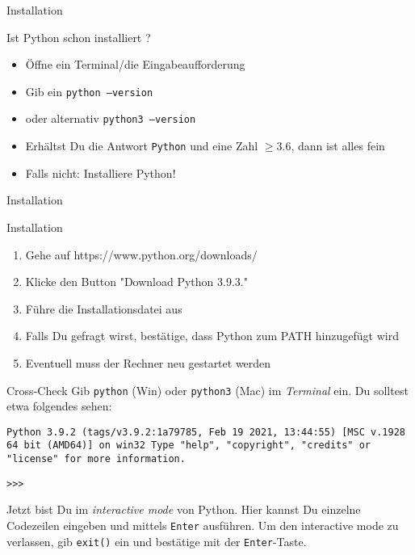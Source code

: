\documentclass[algorithm,pgfplots,colortheme=dark]{cuzbeamer}
\begin{document}
\begin{frame}{Installation}

\begin{block}{Ist Python schon installiert ?}
	\begin{itemize}
		\item Öffne ein Terminal/die Eingabeaufforderung
		\item Gib ein \texttt{python --version}
		\item oder alternativ \texttt{python3 --version}
		\item Erhältst Du die Antwort \texttt{Python} und eine Zahl $\geq 3.6$, dann ist alles fein
		\item Falls nicht: Installiere Python!
	\end{itemize}
\end{block}
\end{frame}


\begin{frame}{Installation}
\begin{block}{Installation}
\begin{enumerate}
	\item Gehe auf https://www.python.org/downloads/
	\item Klicke den Button "Download Python 3.9.3."
	\item Führe die Installationsdatei aus
	\item Falls Du gefragt wirst, bestätige, dass Python zum PATH hinzugefügt wird
	\item Eventuell muss der Rechner neu gestartet werden
\end{enumerate}	
\end{block}
\end{frame}

\begin{frame}
\begin{block}{Cross-Check}
\vspace{2pt}
Gib \texttt{python} (Win) oder \texttt{python3} (Mac) im \textit{Terminal} ein.
Du solltest etwa folgendes sehen:  
\vspace{12pt}

\texttt{Python 3.9.2 (tags/v3.9.2:1a79785, Feb 19 2021, 13:44:55) [MSC v.1928 64 bit (AMD64)] on win32
	Type "help", "copyright", "credits"{} or "license"{} for more information.}

\texttt{>{}>{}>}
\end{block}
\begin{block}{}
Jetzt bist Du im \textit{interactive mode} von Python. Hier kannst Du einzelne Codezeilen eingeben und mittels \texttt{Enter} ausführen. 
Um den interactive mode zu verlassen, gib \texttt{exit()} ein und bestätige mit der \texttt{Enter}-Taste. 	
\end{block}
\end{frame}
\end{document}
